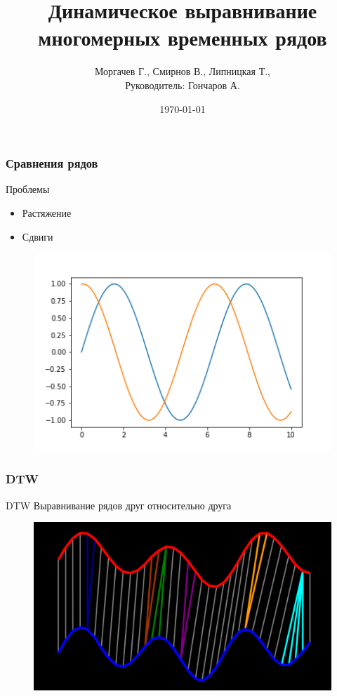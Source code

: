 \documentclass{beamer}
\title[DTW]{Динамическое выравнивание многомерных временных рядов}
\author{Моргачев Г., Смирнов В., Липницкая Т., \\ Руководитель: Гончаров А.}
\date{\today}
\begin{document}

\begin{frame}
\titlepage 
\end{frame}


\begin{frame}
\frametitle{Сравнения рядов}
	\begin{block}{Проблемы}
        \begin{itemize}
            \item Растяжение
            \item Сдвиги
        \end{itemize}
    \end{block}
    \begin{figure}
        \includegraphics[width=0.6\linewidth]{2}
    \end{figure}
\end{frame}


\begin{frame}
\frametitle{DTW}
    \begin{block}{DTW}
        Выравнивание рядов друг относительно друга
    \end{block}
    \begin{figure}
        \includegraphics[width=0.6\linewidth]{1}
    \end{figure}
\end{frame}
    
\end{document}
